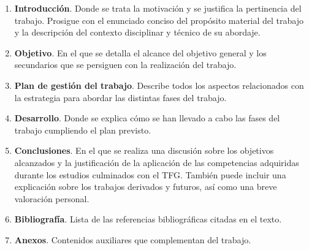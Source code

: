\begin{enumerate}
\item \textbf{Introducción}. Donde se trata la motivación y se justifica la pertinencia del trabajo. Prosigue con el enunciado conciso del propósito material del trabajo y la descripción del contexto disciplinar y técnico de su abordaje.

\item \textbf{Objetivo}. En el que se detalla el alcance del objetivo general y los secundarios que se persiguen con la realización del trabajo.

\item \textbf{Plan de gestión del trabajo}. Describe todos los aspectos relacionados con la estrategia para abordar las distintas fases del trabajo. 

\item \textbf{Desarrollo}. Donde se explica cómo se han llevado a cabo las fases del trabajo cumpliendo el plan previsto.

\item \textbf{Conclusiones}. En el que se realiza una discusión sobre los objetivos alcanzados y la justificación de la aplicación de las competencias adquiridas durante los estudios culminados con el TFG. También puede incluir una explicación sobre los trabajos derivados y futuros, así como una breve valoración personal.

\item \textbf{Bibliografía}. Lista de las referencias bibliográficas citadas en el texto.

\item \textbf{Anexos}. Contenidos auxiliares que complementan del trabajo.
\end{enumerate}









